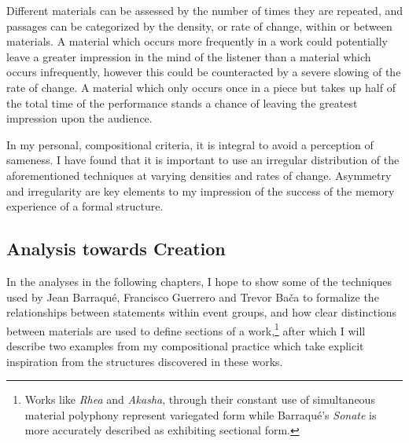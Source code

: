 Different materials can be assessed by the number of times they are repeated, and passages can be categorized by the density, or rate of change, within or between materials. A material which occurs more frequently in a work could potentially leave a greater impression in the mind of the listener than a material which occurs infrequently, however this could be counteracted by a severe slowing of the rate of change. A material which only occurs once in a piece but takes up half of the total time of the performance stands a chance of leaving the greatest impression upon the audience.

In my personal, compositional criteria, it is integral to avoid a perception of sameness. I have found that it is important to use an irregular distribution of the aforementioned techniques at varying densities and rates of change. Asymmetry and irregularity are key elements to my impression of the success of the memory experience of a formal structure.

\subsection{Analysis towards Creation}

In the analyses in the following chapters, I hope to show some of the techniques used by Jean Barraqué, Francisco Guerrero and Trevor Bača to formalize the relationships between statements within event groups, and how clear distinctions between materials are used to define sections of a work,\footnote{Works like \textit{Rhea} and \textit{Akasha}, through their constant use of simultaneous material polyphony represent variegated form while Barraqué's \textit{Sonate} is more accurately described as exhibiting sectional form.} after which I will describe two examples from my compositional practice which take explicit inspiration from the structures discovered in these works.
